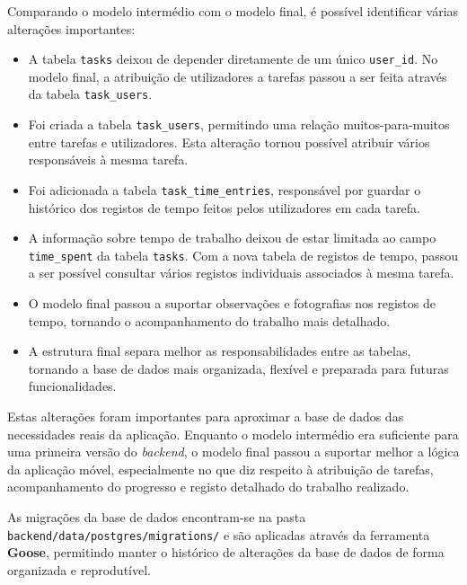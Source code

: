 \documentclass[12pt,a4paper]{article}
\begin{document}
Comparando o modelo intermédio com o modelo final, é possível identificar várias alterações importantes:

\begin{itemize}[leftmargin=*]
\item A tabela \texttt{tasks} deixou de depender diretamente de um único \texttt{user\_id}. No modelo final, a atribuição de utilizadores a tarefas passou a ser feita através da tabela \texttt{task\_users}.

\item Foi criada a tabela \texttt{task\_users}, permitindo uma relação muitos-para-muitos entre tarefas e utilizadores. Esta alteração tornou possível atribuir vários responsáveis à mesma tarefa.

\item Foi adicionada a tabela \texttt{task\_time\_entries}, responsável por guardar o histórico dos registos de tempo feitos pelos utilizadores em cada tarefa.

\item A informação sobre tempo de trabalho deixou de estar limitada ao campo \texttt{time\_spent} da tabela \texttt{tasks}. Com a nova tabela de registos de tempo, passou a ser possível consultar vários registos individuais associados à mesma tarefa.

\item O modelo final passou a suportar observações e fotografias nos registos de tempo, tornando o acompanhamento do trabalho mais detalhado.

\item A estrutura final separa melhor as responsabilidades entre as tabelas, tornando a base de dados mais organizada, flexível e preparada para futuras funcionalidades.

\end{itemize}

Estas alterações foram importantes para aproximar a base de dados das necessidades reais da aplicação. Enquanto o modelo intermédio era suficiente para uma primeira versão do \textit{backend}, o modelo final passou a suportar melhor a lógica da aplicação móvel, especialmente no que diz respeito à atribuição de tarefas, acompanhamento do progresso e registo detalhado do trabalho realizado.

As migrações da base de dados encontram-se na pasta \texttt{backend/data/postgres/migrations/} e são aplicadas através da ferramenta \textbf{Goose}, permitindo manter o histórico de alterações da base de dados de forma organizada e reprodutível.
\end{document}
